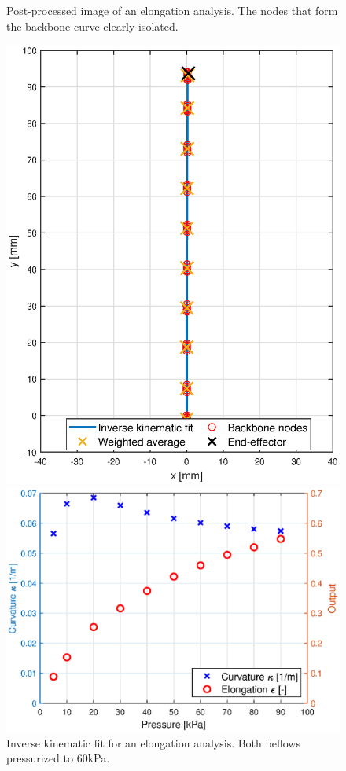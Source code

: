 \begin{figure}[H]
\begin{minipage}{0.5\textwidth}
        \caption{Post-processed image of an elongation analysis. The nodes that form the backbone curve clearly isolated.}
        \label{fig3:nodalelong}
    \end{minipage}
\begin{minipage}{0.5\textwidth}
        \centering
        \includegraphics[width=\textwidth]{Figures/Chapter3/nodalfitelong.eps}
        \caption{Inverse kinematic fit for an elongation analysis. Both bellows pressurized to 60kPa.}
        \label{fig3:nodalfitelong}
    \end{minipage}\hfill
    \begin{minipage}{0.5\textwidth}
        \centering
        \includegraphics[width=\textwidth]{Figures/Chapter3/elongationvspressure.eps} 

\end{minipage}
\end{figure}
